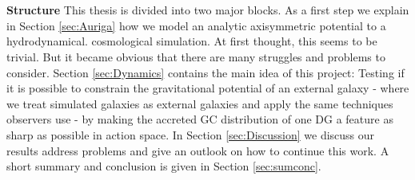 \\\\
\textbf{Structure}
This thesis is divided into two major blocks. As a first step we explain in Section \ref{sec:Auriga} how we model an analytic axisymmetric potential to a hydrodynamical. cosmological simulation. At first thought, this seems to be trivial. But it became obvious that there are many struggles and problems to consider. Section \ref{sec:Dynamics} contains the main idea of this project: Testing if it is possible to constrain the gravitational potential of an external galaxy - where we treat simulated galaxies as external galaxies and apply the same techniques observers use - by making the accreted \ac{GC} distribution of one \ac{DG} a feature as sharp as possible in action space. In Section \ref{sec:Discussion} we discuss our results address problems and give an outlook on how to continue this work. A short summary and conclusion is given in Section \ref{sec:sumconc}.